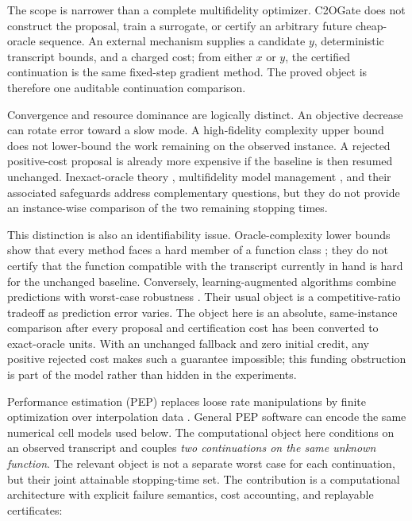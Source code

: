 \documentclass[smallextended]{svjour3}
\begin{document}
The scope is narrower than a complete multifidelity optimizer.  C2OGate does
not construct the proposal, train a surrogate, or certify an arbitrary future
cheap-oracle sequence.  An external mechanism supplies a candidate $y$,
deterministic transcript bounds, and a charged cost; from either $x$ or $y$,
the certified continuation is the same fixed-step gradient method.  The
proved object is therefore one auditable continuation comparison.

Convergence and resource dominance are logically distinct.  An objective
decrease can rotate error toward a slow mode.  A high-fidelity complexity upper
bound does not lower-bound the work remaining on the observed instance.  A
rejected positive-cost proposal is already more expensive if the baseline is
then resumed unchanged.  Inexact-oracle theory \citep{Carter1991,Devolder2014,
Bellavia2019,DeKlerkGlineurTaylor2020}, multifidelity model management
\citep{Alexandrov1998,ConnScheinbergVicente2009,Peherstorfer2018,Kouri2014,
Ziems2011}, and their associated safeguards address complementary questions,
but they do not provide an instance-wise comparison of the two remaining
stopping times.

This distinction is also an identifiability issue.  Oracle-complexity lower
bounds show that every method faces a hard member of a function class
\citep{NemirovskyYudin1983,DroriTaylor2022}; they do not certify that the function compatible
with the transcript currently in hand is hard for the unchanged baseline.
Conversely, learning-augmented algorithms combine predictions with worst-case
robustness \citep{LykourisVassilvitskii2018}.  Their usual object is a
competitive-ratio tradeoff as prediction error varies.  The object here is an
absolute, same-instance comparison after every proposal and certification cost
has been converted to exact-oracle units.  With an unchanged fallback and zero
initial credit, any positive rejected cost makes such a guarantee impossible;
this funding obstruction is part of the model rather than hidden in the
experiments.

Performance estimation (PEP) replaces loose rate manipulations by finite
optimization over interpolation data \citep{DroriTeboulle2014,TaylorPEP2017,
TaylorInterpolation2017}.  General PEP software can encode the same numerical
cell models used below.  The computational object here conditions on an observed
transcript and couples \emph{two continuations on the same unknown function}.
The relevant object is not a separate worst case for each continuation, but
their joint attainable stopping-time set.  The contribution is a computational
architecture with explicit failure semantics, cost accounting, and replayable
certificates:
\end{document}
